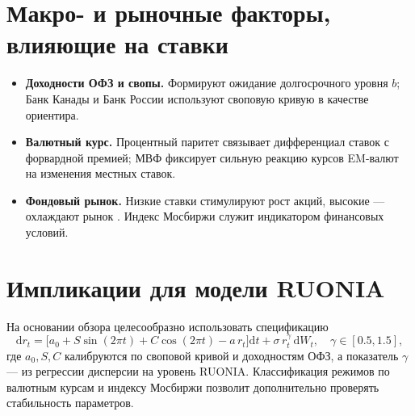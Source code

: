 \section{Макро- и рыночные факторы, влияющие на ставки}
\begin{itemize}
  \item \textbf{Доходности ОФЗ и свопы.} Формируют ожидание долгосрочного уровня $b$; Банк Канады \autocite{BoC2007} и Банк России \autocite{BoCRu2023} используют своповую кривую в качестве ориентира.
  \item \textbf{Валютный курс.} Процентный паритет связывает дифференциал ставок с форвардной премией; МВФ \autocite{IMF2023} фиксирует сильную реакцию курсов EM-валют на изменения местных ставок.
  \item \textbf{Фондовый рынок.} Низкие ставки стимулируют рост акций, высокие — охлаждают рынок \autocite{RBC2024}. Индекс Мосбиржи служит индикатором финансовых условий.
\end{itemize}

\section{Импликации для модели RUONIA}
На основании обзора целесообразно использовать спецификацию
\[
  \mathrm{d}r_t = \bigl[a_0 + S\sin(2\pi t) + C\cos(2\pi t) - a\,r_t\bigr]\mathrm{d}t
    + \sigma\,r_t^{\gamma}\,\mathrm{d}W_t,
  \quad \gamma\in[0.5,1.5],
\]
где $a_0,S,C$ калибруются по своповой кривой и доходностям ОФЗ, а показатель $\gamma$ — из регрессии дисперсии на уровень RUONIA. Классификация режимов по валютным курсам и индексу Мосбиржи позволит дополнительно проверять стабильность параметров.
